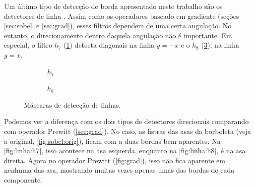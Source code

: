 Um último tipo de detecção de borda apresentado neste trabalho são os detectores de linha \autocite{ref:linedet}. Assim como os operadores baseado em gradiente (seções \ref{sec:sobel} e \ref{sec:grad}), esses filtros dependem de uma certa angulação. No entanto, o direcionamento dentro daquela angulação não é importante. Em especial, o filtro $h_7$ (\ref{fig:h7}) detecta diagonais na linha $y = -x$ e o $h_8$ (\ref{fig:h8}), na linha $y = x$.

\begin{figure}[H]
    \centering
    \begin{subfigure}{0.4\textwidth}
        \centering
        
        \caption{~$h_7$}
        \label{fig:h7}
    \end{subfigure}%
    \begin{subfigure}{0.4\textwidth}
        \centering
        
        \caption{~$h_8$}
        \label{fig:h8}
    \end{subfigure}

    \caption{Máscaras de detecção de linhas.}
\end{figure}

Podemos ver a diferença com os dois tipos de detectores direcionais comparando com operador Prewitt (\cref{sec:grad}). No caso, as listras das asas da borboleta (veja a original, \cref{fig:sobel:orig}), ficam com a duas bordas bem aparentes. Na \cref{fig:linha:h7}, isso acontece na asa esquerda, enquanto na \cref{fig:linha:h8}, é na asa direita. Agora no operador Prewitt (\cref{fig:grad}), isso não fica aparente em nenhuma das asa, mostrando muitas vezes apenas umas das bordas de cada componente.


